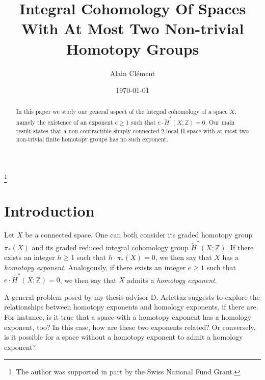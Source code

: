 \documentclass{amsart}
\theoremstyle{definition}
\theoremstyle{remark}
\newcommand{\Z}{\mathbb{Z}}
\renewcommand{\geq}{\geqslant}
\begin{document}
\title{Integral Cohomology Of Spaces With At Most Two Non-trivial Homotopy Groups}

\author{Alain Cl\'ement}
\thanks{The author was supported in part by the Swiss National Fund Grant.}

\date{\today}



\begin{abstract}
In this paper we study one general aspect of the integral cohomology of a space $X$, namely the existence of an exponent $e\geq1$ such that $e\cdot \widetilde{H}^*(X;\Z)=0$. Our main result states that a non-contractible simply-connected $2$-local H-space with at most two non-trivial finite homotopy groups has no such exponent.
\end{abstract}

\maketitle


\section{Introduction}

Let $X$ be a connected space. One can both consider its graded homotopy group $\pi_*(X)$ and its graded reduced integral cohomology group $\widetilde{H}^*(X;\Z)$. If there exists an integer $h\geq1$ such that $h\cdot\pi_*(X)=0$, we then say that $X$ has a {\it homotopy exponent}. Analogously, if there exists an integer $e\geq1$ such that $e\cdot \widetilde{H}^*(X;\Z)=0$, we then say that $X$ admits a {\it homology exponent}.

A general problem posed by my thesis advisor D. Arlettaz suggests to explore the relationships between homotopy exponents and homology exponents, if there are. For instance, is it true that a space with a homotopy exponent has a homology exponent, too? In this case, how are these two exponents related? Or conversely, is it possible for a space without a homotopy exponent to admit a homology exponent?
\end{document}
